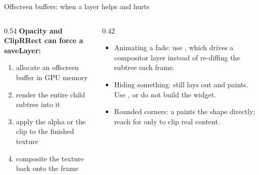 \documentclass[10pt,aspectratio=169,t]{beamer}
\begin{document}
\begin{frame}[eyebrow=Optimization]{Offscreen buffers: when a layer helps and hurts}
  \begin{columns}[T]
    \begin{column}{0.54\textwidth}
      \textbf{Opacity and ClipRRect can force a saveLayer:}
      \begin{enumerate}
        \item allocate an offscreen buffer in GPU memory
        \item render the entire child subtree into it
        \item apply the alpha or the clip to the finished texture
        \item composite the texture back onto the frame
      \end{enumerate}
    \end{column}
    \begin{column}{0.42\textwidth}
      \begin{itemize}
        \item Animating a fade: use , which drives a compositor layer instead of re-diffing the subtree each frame.
        \item Hiding something:  still lays out and paints. Use , or do not build the widget.
        \item Rounded corners: a  paints the shape directly; reach for  only to clip real content.
      \end{itemize}
    \end{column}
  \end{columns}
\end{frame}
\end{document}

